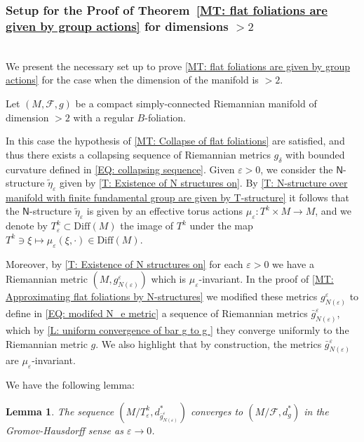 \documentclass[12pt,a4paper,reqno]{amsart}
\newtheorem{lemma}[theorem]{Lemma}
\theoremstyle{definition}
\numberwithin{equation}{section}
\newcommand{\fol}{\mathcal{F}}
\newcommand{\Ns}{\mathsf{N}}
\begin{document}
\subsubsection*{Setup for the Proof of Theorem~\ref{MT: flat foliations are given by group actions} for dimensions $>2$}\hfill\\
We present the necessary set up to prove \th\ref{MT: flat foliations are given by group actions} for the case when the dimension of the manifold is $>2$. 

Let $(M,\fol,g)$ be a compact simply-connected Riemannian manifold of dimension $>2$ with a regular $B$-foliation. 

In this case the hypothesis of \th\ref{MT: Collapse of flat foliations} are satisfied, and thus there exists a collapsing sequence of Riemannian metrics $g_\delta$ with bounded curvature defined in \eqref{EQ: collapsing sequence}. Given $\varepsilon>0$, we consider the $\Ns$-structure $\widetilde{\eta}_\varepsilon$ given by \th\ref{T: Existence of N structures on}. By \th\ref{T: N-structure over manifold with finite fundamental group are given by T-structure} it follows that the $\Ns$-structure $\widetilde{\eta}_\varepsilon$  is given by an effective torus actions $\mu_\varepsilon\colon T^k\times M\to M$, and we  denote by $T^k_\varepsilon\subset \mathrm{Diff}(M)$ the image of $T^k$ under the map $T^k\ni\xi\mapsto \mu_\varepsilon(\xi,\cdot)\in \mathrm{Diff}(M)$. 

Moreover, by \th\ref{T: Existence of N structures on} for each $\varepsilon>0$ we have a Riemannian metric $(M,g^\varepsilon_{N(\varepsilon)})$ which is $\mu_\varepsilon$-invariant. In the proof of \th\ref{MT: Approximating flat foliations by N-structures} we modified these metrics $g^\varepsilon_{N(\varepsilon)}$ to define in \eqref{EQ: modifed N_e metric} a sequence of Riemannian metrics $\bar{g}^\varepsilon_{N(\varepsilon)}$, which by \th\ref{L: uniform convergence of bar g to g } they converge uniformly to the Riemannian metric $g$. We also highlight that by construction, the metrics $\bar{g}^\varepsilon_{N(\varepsilon)}$ are $\mu_\varepsilon$-invariant.

We have the following lemma:

\begin{lemma}\th\label{Cl: Convergence of modified orbit spaces converges to leaf space}
The sequence $(M/T^k_\varepsilon,d^\ast_{\bar{g}^\varepsilon_{N(\varepsilon)}})$ converges to $(M/\fol,d_g^\ast)$ in the Gromov-Haus\-dorff sense as $\varepsilon\to 0$.
\end{lemma}
\end{document}
